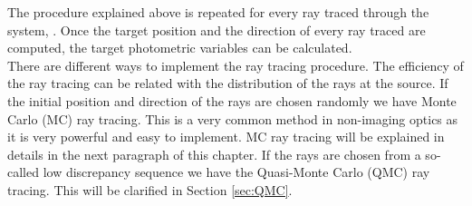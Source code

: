 The procedure explained above is repeated for every ray traced through the system, \cite{Gross2005Handbook}. 
Once the target position and the direction of every ray traced are computed, the target photometric variables can be calculated.\\ \indent
There are different ways to implement the ray tracing procedure. The efficiency of the ray tracing can be related with the distribution of the rays at the source. 
If the initial position and direction of the rays are chosen randomly we have Monte Carlo (MC) ray tracing. 
This is a very common method in non-imaging optics as it is very powerful and easy to implement. MC ray tracing will be explained in details in the next paragraph of this chapter.
If the rays are chosen from a so-called low discrepancy sequence we have the Quasi-Monte Carlo (QMC) ray tracing.
This will be clarified in Section \ref{sec:QMC}.
